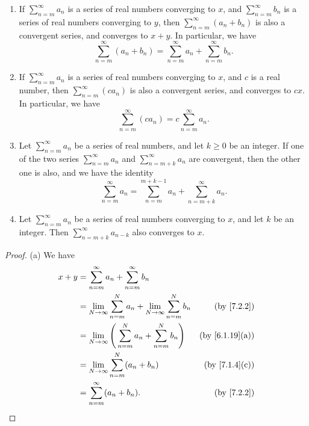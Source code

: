 \setcounter{theorem}{13}
\begin{proposition}\label{7.2.14}
  \mbox{}
  \begin{enumerate}
    \item If \(\sum_{n = m}^\infty a_n\) is a series of real numbers converging to \(x\), and \(\sum_{n = m}^\infty b_n\) is a series of real numbers converging to \(y\), then \(\sum_{n = m}^\infty (a_n + b_n)\) is also a convergent series, and converges to \(x + y\).
          In particular, we have
          \[
            \sum_{n = m}^\infty (a_n + b_n) = \sum_{n = m}^\infty a_n + \sum_{n = m}^\infty b_n.
          \]
    \item If \(\sum_{n = m}^\infty a_n\) is a series of real numbers converging to \(x\), and \(c\) is a real number, then \(\sum_{n = m}^\infty (c a_n)\) is also a convergent series, and converges to \(cx\).
          In particular, we have
          \[
            \sum_{n = m}^\infty (c a_n) = c \sum_{n = m}^\infty a_n.
          \]
    \item Let \(\sum_{n = m}^\infty a_n\) be a series of real numbers, and let \(k \geq 0\) be an integer.
          If one of the two series \(\sum_{n = m}^\infty a_n\) and \(\sum_{n = m + k}^\infty a_n\) are convergent, then the other one is also, and we have the identity
          \[
            \sum_{n = m}^\infty a_n = \sum_{n = m}^{m + k - 1} a_n + \sum_{n = m + k}^\infty a_n.
          \]
    \item Let \(\sum_{n = m}^\infty a_n\) be a series of real numbers converging to \(x\), and let \(k\) be an integer.
          Then \(\sum_{n = m + k}^\infty a_{n - k}\) also converges to \(x\).
  \end{enumerate}
\end{proposition}

\begin{proof}{(a)}
  We have
  \begin{align*}
    x + y & = \sum_{n = m}^\infty a_n + \sum_{n = m}^\infty b_n                                                              \\
          & = \lim_{N \to \infty} \sum_{n = m}^N a_n + \lim_{N \to \infty} \sum_{n = m}^N b_n & \text{(by \cref{7.2.2})}     \\
          & = \lim_{N \to \infty} \Bigg(\sum_{n = m}^N a_n + \sum_{n = m}^N b_n\Bigg)         & \text{(by \cref{6.1.19}(a))} \\
          & = \lim_{N \to \infty} \sum_{n = m}^N (a_n + b_n)                                  & \text{(by \cref{7.1.4}(c))}  \\
          & = \sum_{n = m}^\infty (a_n + b_n).                                                & \text{(by \cref{7.2.2})}
  \end{align*}
\end{proof}


